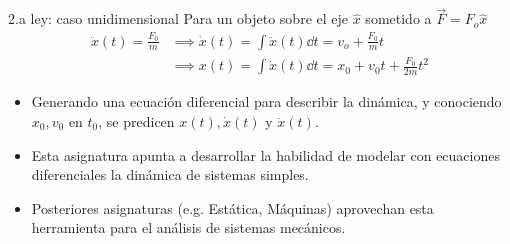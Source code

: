 \documentclass[serif]{beamer}
\begin{document}
\begin{frame}
\begin{block}{2.a ley: caso unidimensional}
Para un objeto sobre el eje \(\hat{x}\) sometido a \(\vec{F}= F_o \hat{x}\)
\begin{align*}
\ddot{x}(t)= \frac{F_0}{m}
& \implies \dot{x}(t)= \int \ddot{x}(t) \dd{t} = v_o + \frac{F_0}{m} t \\
& \implies x(t)= \int \dot{x}(t) \dd{t} = x_0 + v_0 t + \frac{F_0}{2 m} t^2
\end{align*}
\pause
\begin{itemize}				
\item<2-> Generando una ecuación diferencial para describir la dinámica, y conociendo \(x_0, v_0\) en \(t_0\), se predicen \(x(t), \dot{x}(t)\) y \(\ddot{x}(t)\).
\item<3-> Esta asignatura apunta a desarrollar la habilidad de modelar con ecuaciones diferenciales la dinámica de sistemas simples.
\item<4-> Posteriores asignaturas (e.g. Estática, Máquinas) aprovechan esta herramienta para el análisis de sistemas mecánicos.
\end{itemize}				
\end{block}
\end{frame}


\end{document}
